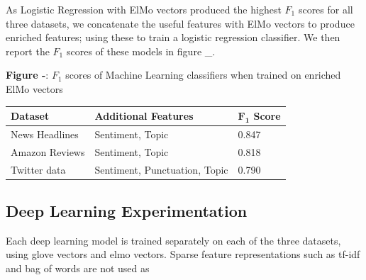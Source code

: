 \documentclass[12pt,a4paper]{article}
\begin{document}
As Logistic Regression with ElMo vectors produced the highest $F_1$ scores for all three datasets, we concatenate the useful features with ElMo vectors to produce enriched features; using these to train a logistic regression classifier. We then report the $F_1$ scores of these models in figure \_.

\begin{center}
	\textbf{Figure -}: $F_1$ scores of Machine Learning classifiers when trained on enriched ElMo vectors
\end{center}

\begin{center}
	\begin{tabular}{ |p{3cm}||p{5.2cm}|p{2cm}|  }
		\hline
		\textbf{Dataset} & \textbf{Additional Features} & \textbf{$\mathbf{F_1}$ Score}\\
		\hline\hline
		News Headlines & Sentiment, Topic   & 0.847\\
		\hline
		Amazon Reviews& Sentiment, Topic & 0.818\\
		\hline
		Twitter data & Sentiment, Punctuation, Topic  & 0.790\\
		\hline
	\end{tabular}
\end{center}


%



\newpage
\subsection{Deep Learning Experimentation}
\noindent Each deep learning model is trained separately on each of the three datasets, using glove vectors and elmo vectors. Sparse feature representations such as tf-idf and bag of words are not used as\\
\end{document}
